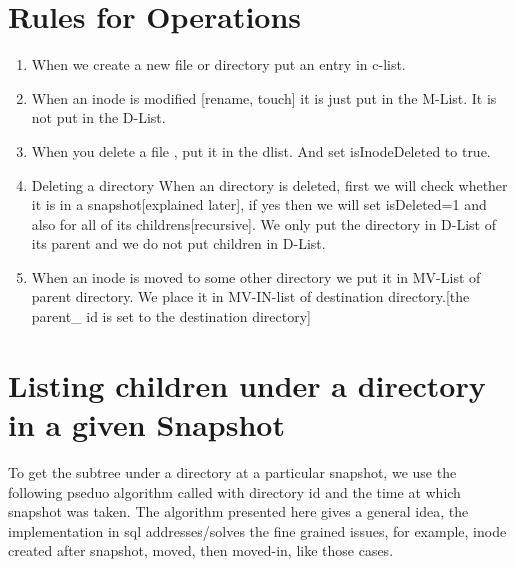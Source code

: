 \section{Rules for Operations}
\begin{enumerate}

\item  When we create a new file or directory put an entry in c-list.

\item When an inode is modified [rename, touch] it is just put in the M-List. It is not put in the D-List.

\item When you delete a file , put it in the dlist. And set isInodeDeleted to true.

\item Deleting a directory
When an directory is deleted, first we will check  whether it is in a snapshot[explained later], if yes then we will set isDeleted=1 and also for all of its childrens[recursive]. We only put the directory in D-List of its parent and we do not put children in D-List.

\item When an inode is moved to some other directory we put it in  MV-List of parent directory. We place it in MV-IN-list of destination  directory.[the parent\_ id is set to the destination directory]

\end{enumerate}

\section{Listing children under a directory in a given Snapshot}
To get the subtree under a directory at a particular snapshot, we use the following pseduo algorithm called with directory id and the time at which snapshot was taken. The algorithm presented here gives a general idea, the implementation in sql\cite{Snapshot-ls} addresses/solves the fine grained issues, for example, inode created after snapshot, moved, then moved-in, like those cases.

